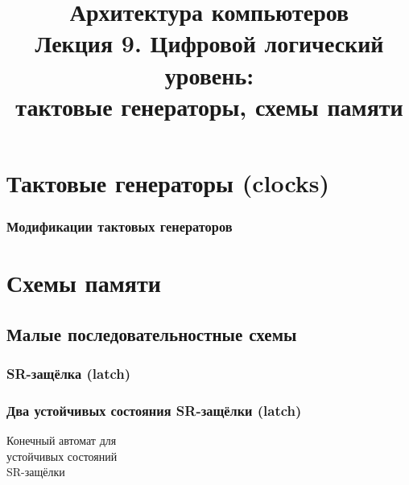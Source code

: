 \newcommand{\h}{%
handout,%
}



\usepackage{tikz}
\usetikzlibrary{arrows,automata}

\usepackage{framed}
\usepackage{tabu}

\newcommand{\p}{\textbf{\textcolor{green}{+}}}
\newcommand{\m}{\textbf{\textcolor{red}{–}}}

\title[Цифровая логика: схемы памяти]{Архитектура компьютеров\texorpdfstring{\\}{ }Лекция 9. Цифровой логический уровень:\texorpdfstring{\\}{ }тактовые генераторы, схемы памяти}



\begin{frame}
\titlepage
\end{frame}

\section{Тактовые генераторы (clocks)}
\begin{frame}
\frametitle{Модификации тактовых генераторов}
\end{frame}

\section {Схемы памяти}

\subsection{Малые последовательностные схемы}

\begin{frame}
\frametitle{SR-защёлка (latch)}
\end{frame}

\begin{frame}
\frametitle{Два устойчивых состояния SR-защёлки (latch)}

\begin{minipage}{8cm}
\begin{framed}
\vspace{-.2cm}
        \parbox{4cm}{Конечный автомат для\\
            устойчивых состояний\\SR-защёлки}
        \parbox{3cm}{}
\vspace{-.2cm}
\end{framed}
\end{minipage}
\end{frame}

